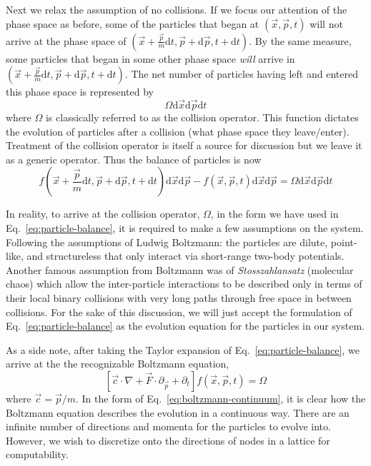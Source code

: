 Next we relax the assumption of no collisions. If we focus our attention of the phase space as before, some of the particles that began at $(\vec{x},\vec{p},t)$ will not arrive at the phase space of $(\vec{x} + \frac{\vec{p}}{m}\mathrm{d}t,\vec{p} + \mathrm{d}\vec{p},t + \mathrm{d}t)$. By the same measure, some particles that began in some other phase space \textit{will} arrive in $(\vec{x} + \frac{\vec{p}}{m}\mathrm{d}t,\vec{p} + \mathrm{d}\vec{p},t + \mathrm{d}t)$. The net number of particles having left and entered this phase space is represented by
\begin{equation}
	\Omega\mathrm{d}\vec{x}\mathrm{d}\vec{p}\mathrm{d}t
\end{equation}
where $\Omega$ is classically referred to as the collision operator. This function dictates the evolution of particles after a collision (what phase space they leave/enter). Treatment of the collision operator is itself a source for discussion but we leave it as a generic operator. Thus the balance of particles is now
\begin{equation}\label{eq:particle-balance}
	f(\vec{x} + \frac{\vec{p}}{m}\mathrm{d}t,\vec{p} + \mathrm{d}\vec{p},t + \mathrm{d}t)\mathrm{d}\vec{x}\mathrm{d}\vec{p} - f(\vec{x},\vec{p},t)\mathrm{d}\vec{x}\mathrm{d}\vec{p} = \Omega\mathrm{d}\vec{x}\mathrm{d}\vec{p}\mathrm{d}t
\end{equation}

In reality, to arrive at the collision operator, $\Omega$, in the form we have used in Eq.~\ref{eq:particle-balance}, it is required to make a few assumptions on the system. Following the assumptions of Ludwig Boltzmann: the particles are dilute, point-like, and structureless that only interact via short-range two-body potentials. Another famous assumption from Boltzmann was of \textit{Stosszahlansatz} (molecular chaos) which allow the inter-particle interactions to be described only in terms of their local binary collisions with very long paths through free space in between collisions.\cite{succi2001lattice} For the sake of this discussion, we will just accept the formulation of Eq.~\ref{eq:particle-balance} as the evolution equation for the particles in our system. 

As a side note, after taking the Taylor expansion of Eq.~\ref{eq:particle-balance}, we arrive at the the recognizable Boltzmann equation,
\begin{equation}\label{eq:boltzmann-continuum}
	\left[\vec{c}\cdot\nabla + \vec{F}\cdot\partial_\vec{p}  + \partial_t\right] f(\vec{x},\vec{p},t) = \Omega
\end{equation}
where $\vec{c} = \vec{p}/m$. In the form of Eq.~\ref{eq:boltzmann-continuum}, it is clear how the Boltzmann equation describes the evolution in a continuous way. There are an infinite number of directions and momenta for the particles to evolve into. However, we wish to discretize onto the directions of nodes in a lattice for computability.

